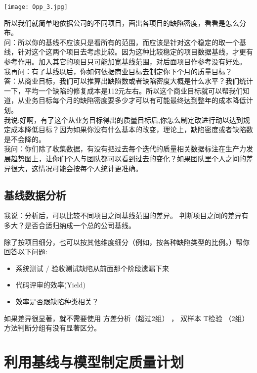 \texttt{[image: Opp\_3.jpg]}

所以我们就简单地依据公司的不同项目，画出各项目的缺陷密度，看看是怎么分布。\\
问：所以你的基线不应该只是看所有的范围，而应该是针对这个稳定的取一个基线，针对这个这两个项目去考虑比较。因为这种比较稳定的项目数据基线，才更有参考作用。加入其它的项目只可能加宽基线范围，对后面项目作参考没有好处。\\
我再问：有了基线以后，你如何依据商业目标去制定你下个月的质量目标？\\
答：从商业目标，我们可以推算出缺陷数或者缺陷密度大概是什么水平？我们统计一下，平均一个缺陷的修复成本是112元左右。所以这个商业目标就可以帮我们知道，从业务目标每个月的缺陷密度要多少才可以有可能最终达到整年的成本降低计划。\\
我说:好啊，有了这个从业务目标得出的质量目标后,你怎么制定改进行动以达到规定成本降低目标？因为如果你没有什么基本的改变，理论上，缺陷密度或者缺陷数是不会降的。\\
我问：你们除了收集数据，有没有把过去每个迭代的质量相关数据标注在生产力发展趋势图上，让你们个人与团队都可以看到过去的变化？如果团队里个人之间的差异很大，这情况可能会按每个人统计更准确。

\hypertarget{ux57faux7ebfux6570ux636eux5206ux6790}{%
\subsection{基线数据分析}\label{ux57faux7ebfux6570ux636eux5206ux6790}}

我说：分析后，可以比较不同项目之间基线范围的差异。
判断项目之间的差异有多大？是否合适归纳成一个总的公司基线。

除了按项目细分，也可以按其他维度细分（例如，按各种缺陷类型的比例。）帮你回答以下问题:

\begin{itemize}
\tightlist
\item
  系统测试 / 验收测试缺陷从前面那个阶段遗漏下来
\item
  代码评审的效率(Yield)
\item
  效率是否跟缺陷种类相关？
\end{itemize}

如果差异很显著，就不需要使用 方差分析（超过2组） ， 双样本 T检验
（2组）方法判断分组有没有显著区分。

\hypertarget{ux5229ux7528ux57faux7ebfux4e0eux6a21ux578bux5236ux5b9aux8d28ux91cfux8ba1ux5212}{%
\section{利用基线与模型制定质量计划}\label{ux5229ux7528ux57faux7ebfux4e0eux6a21ux578bux5236ux5b9aux8d28ux91cfux8ba1ux5212}}

